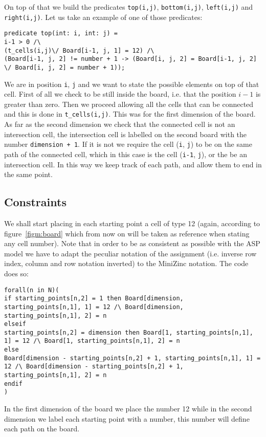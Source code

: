 On top of that we build the predicates \texttt{top(i,j)}, \texttt{bottom(i,j)}, \texttt{left(i,j)} and \texttt{right(i,j)}.
Let us take an example of one of those predicates:
\begin{verbatim}
predicate top(int: i, int: j) =
i-1 > 0 /\ 
(t_cells(i,j)\/ Board[i-1, j, 1] = 12) /\ 
(Board[i-1, j, 2] != number + 1 -> (Board[i, j, 2] = Board[i-1, j, 2]  \/ Board[i, j, 2] = number + 1));
\end{verbatim}
We are in position \texttt{i}, \texttt{j} and we want to state the possible elements on top of that cell. First of all we check to be still inside the board, i.e. that the position $i-1$ is greater than zero. Then we proceed allowing all the cells that can be connected and this is done in \texttt{t_cells(i,j)}. This was for the first dimension of the board. As far as the second dimension we check that the connected cell is not an intersection cell, the intersection cell is labelled on the second board with the number \texttt{dimension + 1}. If it is not we require the cell (\texttt{i}, \texttt{j}) to be on the same path of the connected cell, which in this case is the cell (\texttt{i-1}, \texttt{j}), or the be an intersection cell. In this way we keep track of each path, and allow them to end in the same point.

\subsection{Constraints}
We shall start placing in each starting point a cell of type 12 (again, according to figure~\ref{figm:board} which from now on will be taken as reference when stating any cell number). Note that in order to be as consistent as possible with the ASP model we have to adapt the peculiar notation of the assignment (i.e. inverse row index, column and row notation inverted) to the MiniZinc notation. The code does so:

\begin{verbatim}
forall(n in N)(
if starting_points[n,2] = 1 then Board[dimension, starting_points[n,1], 1] = 12 /\ Board[dimension, starting_points[n,1], 2] = n
elseif
starting_points[n,2] = dimension then Board[1, starting_points[n,1], 1] = 12 /\ Board[1, starting_points[n,1], 2] = n
else
Board[dimension - starting_points[n,2] + 1, starting_points[n,1], 1] = 12 /\ Board[dimension - starting_points[n,2] + 1, starting_points[n,1], 2] = n
endif
)
\end{verbatim}
In the first dimension of the board we place the number 12 while in the second dimension we label each starting point with a number, this number will define each path on the board.

